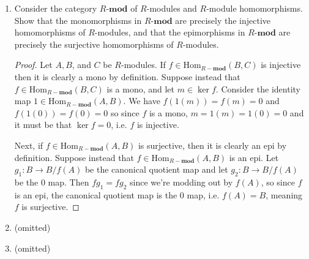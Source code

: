 \documentclass[11pt,oneside,english]{amsart}
\theoremstyle{definition}
\newcommand{\Hom}{\text{Hom}}
\begin{document}
\begin{enumerate}[leftmargin=*]
\pagebreak

\item Consider the category $R\textbf{-mod}$ of $R$-modules and $R$-module homomorphisms. Show that the monomorphisms in $R\textbf{-mod}$ are precisely the injective homomorphisms of $R$-modules, and that the epimorphisms in $R\textbf{-mod}$ are precisely the surjective homomorphisms of $R$-modules.

\begin{proof}
Let $A,B$, and $C$ be $R$-modules. If $f\in\Hom_{R-\textbf{mod}}(B,C)$ is injective then it is clearly a mono by definition. Suppose instead that $f\in\Hom_{R-\textbf{mod}}(B,C)$ is a mono, and let $m\in \ker f$. Consider the identity map $1\in\Hom_{R-\textbf{mod}}(A,B)$. We have $f(1(m))=f(m)=0$ and $f(1(0))=f(0)=0$ so since $f$ is a mono, $m=1(m)=1(0)=0$ and it must be that $\ker f=0$, i.e. $f$ is injective.

Next, if $f\in\Hom_{R-\textbf{mod}}(A,B)$ is surjective, then it is clearly an epi by definition. Suppose instead that $f\in\Hom_{R-\textbf{mod}}(A,B)$ is an epi. Let $g_1:B\to B/f(A)$ be the canonical quotient map and let $g_2:B\to B/f(A)$ be the 0 map. Then $fg_1=fg_2$ since we're modding out by $f(A)$, so since $f$ is an epi, the canonical quotient map is the 0 map, i.e. $f(A)=B$, meaning $f$ is surjective.
\end{proof}


\item (omitted)

\item (omitted)


	
\end{enumerate}
\end{document}
